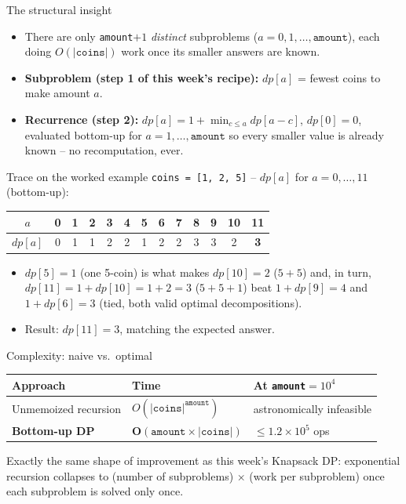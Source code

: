 \documentclass[11pt,aspectratio=169]{beamer}
\begin{document}
\begin{frame}{The structural insight}
  \begin{itemize}
    \item There are only \texttt{amount}$+1$ \emph{distinct} subproblems
    ($a = 0, 1, \dots, \texttt{amount}$), each doing $O(|\texttt{coins}|)$ work once its
    smaller answers are known.
    \item \textbf{Subproblem (step 1 of this week's recipe):} $dp[a]$ = fewest coins to
    make amount $a$.
    \item \textbf{Recurrence (step 2):} $dp[a] = 1 + \min_{c \le a} dp[a-c]$,
    $dp[0]=0$, evaluated bottom-up for $a = 1, \dots, \texttt{amount}$ so every smaller
    value is already known -- no recomputation, ever.
  \end{itemize}
\end{frame}

\begin{frame}{Trace on the worked example}
  \scriptsize
  \texttt{coins = [1, 2, 5]} -- $dp[a]$ for $a = 0, \dots, 11$ (bottom-up):
  \begin{center}
  \begin{tabular}{@{}c*{12}{c}@{}}
    \toprule
    $a$ & 0 & 1 & 2 & 3 & 4 & 5 & 6 & 7 & 8 & 9 & 10 & 11 \\
    \midrule
    $dp[a]$ & 0 & 1 & 1 & 2 & 2 & 1 & 2 & 2 & 3 & 3 & 2 & \textbf{3} \\
    \bottomrule
  \end{tabular}
  \end{center}
  \begin{itemize}
    \item $dp[5]=1$ (one 5-coin) is what makes $dp[10]=2$ ($5+5$) and, in turn,
    $dp[11] = 1+dp[10] = 1 + 2 = 3$ ($5+5+1$) beat $1+dp[9]=4$ and $1+dp[6]=3$ (tied,
    both valid optimal decompositions).
    \item Result: $dp[11] = 3$, matching the expected answer.
  \end{itemize}
\end{frame}

\begin{frame}{Complexity: naive vs.\ optimal}
  \begin{center}
  \begin{tabular}{@{}lll@{}}
    \toprule
    Approach & Time & At \texttt{amount}$=10^4$ \\
    \midrule
    Unmemoized recursion & $O(|\texttt{coins}|^{\texttt{amount}})$ & astronomically
    infeasible \\
    \textbf{Bottom-up DP} & $\boldsymbol{O(\texttt{amount}\times|\texttt{coins}|)}$ &
    $\le 1.2\times10^5$ ops \\
    \bottomrule
  \end{tabular}
  \end{center}
  Exactly the same shape of improvement as this week's Knapsack DP: exponential
  recursion collapses to (number of subproblems) $\times$ (work per subproblem) once
  each subproblem is solved only once.
\end{frame}
\end{document}
